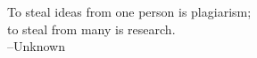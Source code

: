 \documentclass[11pt]{psuthesis}
\begin{document}
\begin{frontmatter}
\vspace*{2.0truein}

%
\parbox{4.0truein}{
\par\noindent
To steal ideas from one person is plagiarism;\\ to steal from many is research.\\
\hspace*{\fill}--Unknown
}
\end{frontmatter}







%
%
%
%
%
%


%
%
%
%

\appendices



%

%
\end{document}
